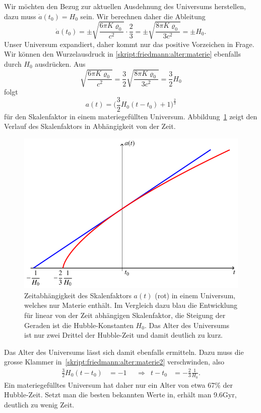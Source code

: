 Wir möchten den Bezug zur aktuellen Ausdehnung des Universums herstellen,
dazu muss $\dot a(t_0)=H_0$ sein.
Wir berechnen daher die Ableitung
\[
\dot a(t_0)=\pm \sqrt{\frac{6\pi K\varrho_0}{c^2}}\cdot \frac23
=
\pm \sqrt{\frac{8\pi K\varrho_0}{3c^2}}
=
\pm H_0.
\]
Unser Universum expandiert, daher kommt nur das positive Vorzeichen in Frage.
Wir können den Wurzelausdruck in \eqref{skript:friedmann:alter:materie} 
ebenfalls durch $H_0$ ausdrücken.
Aus
\[
\sqrt{\frac{6\pi K\varrho_0}{c^2}}
=
\frac32
\sqrt{\frac{8\pi K\varrho_0}{3c^2}}
=
\frac32H_0
\]
folgt
\begin{equation}
a(t) = \biggl(\frac32H_0(t-t_0)+1\biggr)^\frac23
\label{skript:friedmann:alter:materie2}
\end{equation}
für den Skalenfaktor in einem materiegefüllten Universum.
Abbildung~\ref{skript:friedmann:graph:materie} zeigt den Verlauf
des Skalenfaktors in Abhängigkeit von der Zeit.

\begin{figure}
\centering
\includegraphics{chapters/tikz/friedmann-materie.pdf}
\caption{Zeitabhängigkeit des Skalenfaktors $a(t)$ ({\color{red}rot})
in einem Universum, welches nur Materie enthält.
Im Vergleich dazu {\color{blue}blau} die Entwicklung für linear von der
Zeit abhängigen Skalenfaktor, die Steigung der Geraden ist die
Hubble-Konstanten $H_0$.
Das Alter des Universums ist nur zwei Drittel der Hubble-Zeit und damit
deutlich zu kurz.
\label{skript:friedmann:graph:materie}}
\end{figure}

Das Alter des Universums lässt sich damit ebenfalls ermitteln.
Dazu muss die grosse Klammer in~\eqref{skript:friedmann:alter:materie2}
verschwinden, also
\begin{equation}
\begin{aligned}
\frac32H_0(t-t_0)
&=
-1
&&\Rightarrow&
t-t_0
&=
-\frac23 \frac1{H_0}.
\end{aligned}
\label{skript:friedman:23h0}
\end{equation}
Ein materiegefülltes Universum hat daher nur ein Alter von
etwa 67\% der Hubble-Zeit. 
Setzt man die besten bekannten Werte in, erhält man 9.6Gyr,
deutlich zu wenig Zeit.

